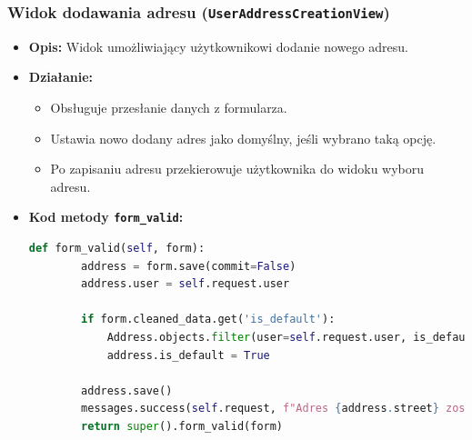 \documentclass[12pt,a4paper,oneside]{article}
\theoremstyle{definition}
\numberwithin{equation}{section}
\begin{document}
\subsubsection*{Widok dodawania adresu (\texttt{UserAddressCreationView})}
\begin{itemize}
    \item \textbf{Opis:} Widok umożliwiający użytkownikowi dodanie nowego adresu.
    \item \textbf{Działanie:}
        \begin{itemize}
            \item Obsługuje przesłanie danych z formularza.
            \item Ustawia nowo dodany adres jako domyślny, jeśli wybrano taką opcję.
            \item Po zapisaniu adresu przekierowuje użytkownika do widoku wyboru adresu.
        \end{itemize}
    \item \textbf{Kod metody \texttt{form\_valid}:}
    \begin{lstlisting}[language=Python, caption=Obsługa poprawnego formularza w \texttt{UserAddressCreationView}]
    def form_valid(self, form):
        address = form.save(commit=False)
        address.user = self.request.user

        if form.cleaned_data.get('is_default'):
            Address.objects.filter(user=self.request.user, is_default=True).update(is_default=False)
            address.is_default = True

        address.save()
        messages.success(self.request, f"Adres {address.street} zostal zapisany.")
        return super().form_valid(form)
    \end{lstlisting}
\end{itemize}
\end{document}
